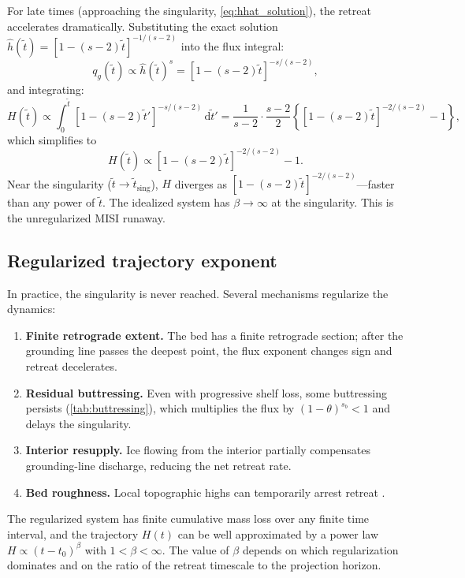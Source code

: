 \documentclass[11pt]{article}
\newcommand{\dd}{\mathrm{d}}
\newcommand{\qg}{q_g}
\newcommand{\hhat}{\hat{h}}
\newcommand{\tdim}{\tilde{t}}
\begin{document}
For late times (approaching the singularity, \cref{eq:hhat_solution}), the retreat accelerates dramatically. Substituting the exact solution $\hhat(\tdim) = [1 - (s-2)\tdim]^{-1/(s-2)}$ into the flux integral:
\begin{equation}
	\qg(\tdim) \propto \hhat(\tdim)^{s} = [1 - (s-2)\tdim]^{-s/(s-2)},
	\label{eq:flux_singular}
\end{equation}
and integrating:
\begin{equation}
	H(\tdim) \propto \int_0^{\tdim} [1 - (s{-}2)\tdim']^{-s/(s-2)}\,\dd\tdim'
	= \frac{1}{s-2}\cdot\frac{s-2}{2}\left\{[1 - (s{-}2)\tdim]^{-2/(s-2)} - 1\right\},
	\label{eq:H_late_integral}
\end{equation}
which simplifies to
\begin{equation}
	H(\tdim) \propto [1 - (s-2)\tdim]^{-2/(s-2)} - 1.
	\label{eq:H_late}
\end{equation}
Near the singularity ($\tdim \to \tdim_{\mathrm{sing}}$), $H$ diverges as $[1-(s-2)\tdim]^{-2/(s-2)}$---faster than any power of $\tdim$. The idealized system has $\beta \to \infty$ at the singularity. This is the unregularized MISI runaway.

\subsection{Regularized trajectory exponent}
\label{sec:beta_regularized}

In practice, the singularity is never reached. Several mechanisms regularize the dynamics:
\begin{enumerate}
	\item \textbf{Finite retrograde extent.} The bed has a finite retrograde section; after the grounding line passes the deepest point, the flux exponent changes sign and retreat decelerates.
	\item \textbf{Residual buttressing.} Even with progressive shelf loss, some buttressing persists (\cref{tab:buttressing}), which multiplies the flux by $(1-\theta)^{s_b} < 1$ and delays the singularity.
	\item \textbf{Interior resupply.} Ice flowing from the interior partially compensates grounding-line discharge, reducing the net retreat rate.
	\item \textbf{Bed roughness.} Local topographic highs can temporarily arrest retreat \citep{Morlighem2020}.
\end{enumerate}

The regularized system has finite cumulative mass loss over any finite time interval, and the trajectory $H(t)$ can be well approximated by a power law $H \propto (t-t_0)^\beta$ with $1 < \beta < \infty$. The value of $\beta$ depends on which regularization dominates and on the ratio of the retreat timescale to the projection horizon.
\end{document}
